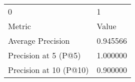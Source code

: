 \begin{tabular}{ll}
0 & 1 \\
Metric & Value \\
Average Precision & 0.945566 \\
Precision at 5 (P@5) & 1.000000 \\
Precision at 10 (P@10) & 0.900000 \\
\end{tabular}
